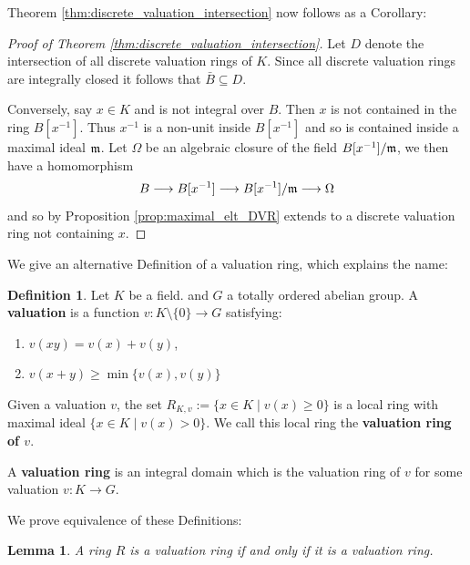 \documentclass[12pt]{article}
\theoremstyle{plain}
\newtheorem{lemma}[thm]{Lemma}
\theoremstyle{definition}
\newtheorem{defn}[thm]{Definition} %
\newcommand{\lto}{\longrightarrow}
\begin{document}
Theorem \ref{thm:discrete_valuation_intersection} now follows as a Corollary:
\begin{proof}[Proof of Theorem \ref{thm:discrete_valuation_intersection}]
Let $D$ denote the intersection of all discrete valuation rings of $K$. Since all discrete valuation rings are integrally closed it follows that $\bar{B} \subseteq D$.

Conversely, say $x \in K$ and is not integral over $B$. Then $x$ is not contained in the ring $B[x^{-1}]$. Thus $x^{-1}$ is a non-unit inside $B[x^{-1}]$ and so is contained inside a maximal ideal $\frak{m}$. Let $\Omega$ be an algebraic closure of the field $B[x^{-1}]/\frak{m}$, we then have a homomorphism \[B \lto B[x^{-1}] \lto B[x^{-1}]/\frak{m} \lto \Omega\]
and so by Proposition \ref{prop:maximal_elt_DVR} extends to a discrete valuation ring not containing $x$.
\end{proof}
We give an alternative Definition of a valuation ring, which explains the name:
\begin{defn}
Let $K$ be a field. and $G$ a totally ordered abelian group. A \textbf{valuation} is a function $v: K\setminus\lbrace 0 \rbrace \lto G$ satisfying:
\begin{enumerate}
\item $v(xy) = v(x) + v(y)$,
\item $v(x + y) \geq \operatorname{min}\lbrace v(x), v(y)\rbrace$
\end{enumerate}
Given a valuation $v$, the set $R_{K,v} := \lbrace x \in K \mid v(x) \geq 0\rbrace$ is a local ring with maximal ideal $\lbrace x \in K \mid v(x) > 0 \rbrace$. We call this local ring the \textbf{valuation ring of $v$}. 

A \textbf{valuation ring} is an integral domain which is the valuation ring of $v$ for some valuation $v: K \lto G$.
\end{defn}
We prove equivalence of these Definitions:
\begin{lemma}
A ring $R$ is a valuation ring if and only if it is a valuation ring.
\end{lemma}
\end{document}
